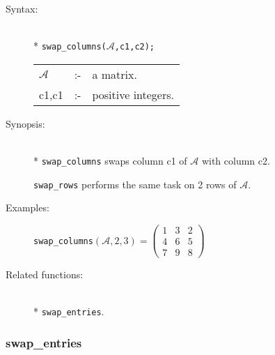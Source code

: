 \begin{description}
\item[Syntax:]\mbox{}\\*
\texttt{swap\_columns($\mathcal{A}$,c1,c2);}\\[2mm]
\begin{tabular}{l l l}
$\mathcal{A}$ &:-& a matrix. \\
c1,c1      &:-& positive integers.
\end{tabular}

\item[Synopsis:]\mbox{}\\*
\texttt{swap\_columns} swaps column c1 of $\mathcal{A}$ with column c2.

\texttt{swap\_rows} performs the same task on 2 rows of $\mathcal{A}$.

\item[Examples:]
\begin{flushleft}
\texttt{swap\_columns}\((\mathcal{A},2,3) =
        \begin{pmatrix} 1 & 3 & 2 \\ 4 & 6 & 5 \\ 7 & 9 & 8 \end{pmatrix}\)
\end{flushleft}

\item[Related functions:]\mbox{}\\*
\texttt{swap\_entries}.
\end{description}


\subsubsection{swap\_entries}
\label{linalg:swap_entries}

